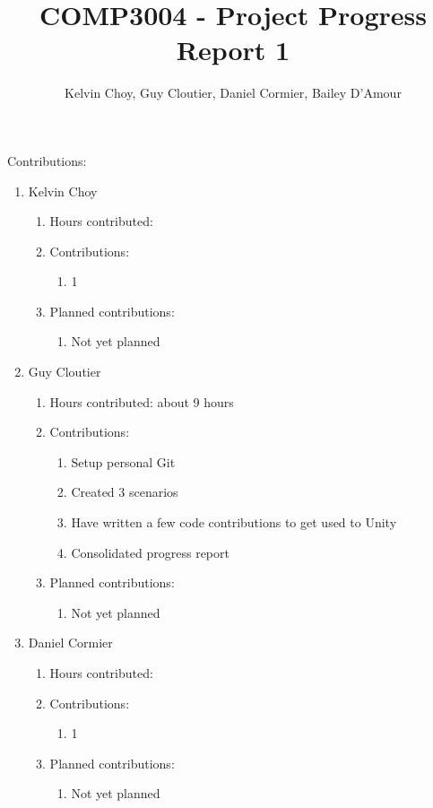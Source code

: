 \documentclass[11pt]{article}
\title{COMP3004 - Project Progress Report 1}
\author{Kelvin Choy, Guy Cloutier, Daniel Cormier, Bailey D'Amour}
\date{}
\begin{document}
\maketitle

Contributions:
\begin{enumerate}
\item Kelvin Choy
\begin{enumerate}
\item Hours contributed:
\item Contributions:
\begin{enumerate}
\item 1
\end{enumerate}
\item Planned contributions:
\begin{enumerate}
\item Not yet planned
\end{enumerate}
\end{enumerate}

\item Guy Cloutier
\begin{enumerate}
\item Hours contributed: about 9 hours
\item Contributions:
\begin{enumerate}
\item Setup personal Git
\item Created 3 scenarios
\item Have written a few code contributions to get used to Unity
\item Consolidated progress report
\end{enumerate}
\item Planned contributions:
\begin{enumerate}
\item Not yet planned
\end{enumerate}
\end{enumerate}

\item Daniel Cormier
\begin{enumerate}
\item Hours contributed:
\item Contributions:
\begin{enumerate}
\item 1
\end{enumerate}
\item Planned contributions:
\begin{enumerate}
\item Not yet planned
\end{enumerate}
\end{enumerate}


\end{enumerate}
\end{document}
